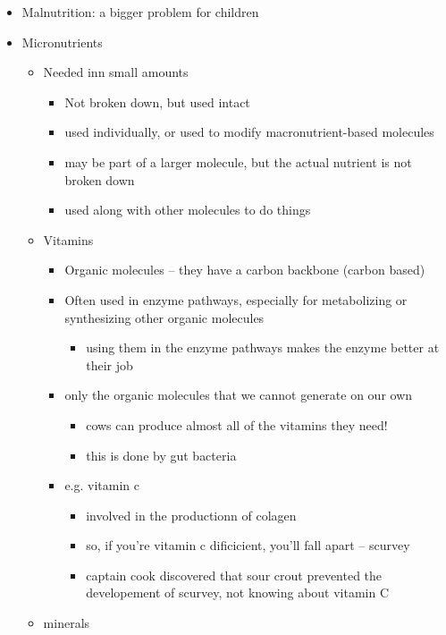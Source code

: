 \documentclass{article}
\theoremstyle{definition}
\begin{document}
\begin{itemize}
	\item Malnutrition: a bigger problem for children
	\item Micronutrients
		\begin{itemize}
			\item Needed inn small amounts
				\begin{itemize}
					\item Not broken down, but used intact
					\item used individually, or used to modify macronutrient-based molecules
					\item may be part of a larger molecule, but the actual nutrient is not broken down
					\item used along with other molecules to do things
				\end{itemize}
			\item Vitamins
				\begin{itemize}
					\item Organic molecules -- they have a carbon backbone (carbon based)
					\item Often used in enzyme pathways, especially for metabolizing or synthesizing other organic molecules
						\begin{itemize}
							\item using them in the enzyme pathways makes the enzyme better at their job
						\end{itemize}
					\item only the organic molecules that we cannot generate on our own
						\begin{itemize}
							\item cows can produce almost all of the vitamins they need!
							\item this is done by gut bacteria
						\end{itemize}
					\item e.g. vitamin c
						\begin{itemize}
							\item involved in the productionn of colagen
							\item so, if you're vitamin c dificicient, you'll fall apart -- scurvey
							\item captain cook discovered that sour crout prevented the developement of scurvey, not knowing about vitamin C
						\end{itemize}
				\end{itemize}
			\item minerals

\end{itemize}
\end{itemize}
\end{document}
